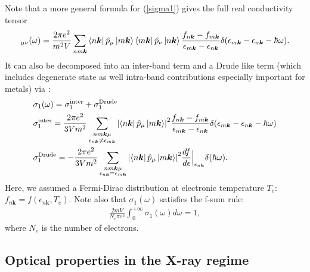 \documentclass[a4,12pts]{extarticle}
\begin{document}
Note that a more general formula for (\ref{sigma1}) gives the full real conductivity tensor
\begin{align}
[\sigma_{1}]_{\mu\nu}(\omega)=\frac{2\pi e^{2}}{m^{2}V}\sum_{nm\boldsymbol{k}}\bra{n\boldsymbol{k}}\hat{p}_{\mu}\ket{m\boldsymbol{k}}\bra{m\boldsymbol{k}}\hat{p}_{\nu}\ket{n\boldsymbol{k}}
\frac{f_{n\boldsymbol{k}}-f_{m\boldsymbol{k}}}{\epsilon_{m\boldsymbol{k}}-\epsilon_{n\boldsymbol{k}}}\delta(\epsilon_{m\boldsymbol{k}}-\epsilon_{n\boldsymbol{k}}-\hbar\omega). \label{sig_tens}
\end{align}
It can also be decomposed into an inter-band term and a Drude like term (which includes degenerate state as well intra-band contributions especially important for metals) via \cite{Calderin2017}:
\begin{align}
&\sigma_1(\omega)=\sigma_1^{\text{inter}}+\sigma_1^{\text{Drude}} \label{sig_decompo}\\
&\sigma_1^{\text{inter}}=\frac{2\pi e^{2}}{3Vm^2}\sum_{\substack{nm\boldsymbol{k}\mu\\ \epsilon_{n\boldsymbol{k}}\neq \epsilon_{m\boldsymbol{k}}}}\abs{\bra{n\boldsymbol{k}}\hat{p}_{\mu}\ket{m\boldsymbol{k}}}^{2}\frac{f_{n\boldsymbol{k}}-f_{m\boldsymbol{k}}}{\epsilon_{m\boldsymbol{k}}-\epsilon_{n\boldsymbol{k}}}\delta(\epsilon_{m\boldsymbol{k}}-\epsilon_{n\boldsymbol{k}}-\hbar\omega) \label{sig_inter}\\
&\sigma_1^{\text{Drude}}=-\frac{2\pi e^{2}}{3Vm^2}\sum_{\substack{nm\boldsymbol{k}\mu\\ \epsilon_{n\boldsymbol{k}}= \epsilon_{m\boldsymbol{k}}}}\abs{\bra{n\boldsymbol{k}}\hat{p}_{\mu}\ket{m\boldsymbol{k}}}^{2}\frac{df}{d\epsilon}\Bigr|_{\epsilon_{n\boldsymbol{k}}}  \delta(\hbar\omega). \label{sig_drude}
\end{align}
Here, we assumed a Fermi-Dirac distribution at electronic temperature $T_e$: $f_{n\boldsymbol{k}}=f(\epsilon_{n\boldsymbol{k}},T_e)$. Note also that $\sigma_1(\omega)$ satisfies the f-sum rule:
\begin{align}\label{sumrule}
\frac{2mV}{N_e\pi e^2}\int_{0}^{+\infty}\sigma_{1}(\omega)d\omega=1,
\end{align}
where $N_e$ is the number of electrons.

\subsection{Optical properties in the X-ray regime} \label{Core}
\end{document}
